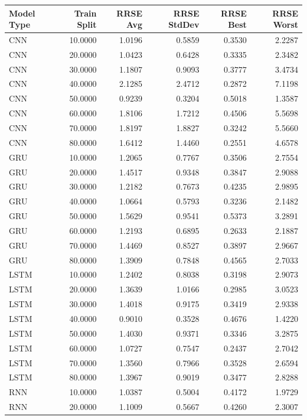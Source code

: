 \begin{tabular}{lrrrrr}
\toprule
Model Type & Train Split & RRSE Avg & RRSE StdDev & RRSE Best & RRSE Worst \\
\midrule
CNN & 10.0000 & 1.0196 & 0.5859 & 0.3530 & 2.2287 \\
CNN & 20.0000 & 1.0423 & 0.6428 & 0.3335 & 2.3482 \\
CNN & 30.0000 & 1.1807 & 0.9093 & 0.3777 & 3.4734 \\
CNN & 40.0000 & 2.1285 & 2.4712 & 0.2872 & 7.1198 \\
CNN & 50.0000 & 0.9239 & 0.3204 & 0.5018 & 1.3587 \\
CNN & 60.0000 & 1.8106 & 1.7212 & 0.4506 & 5.5698 \\
CNN & 70.0000 & 1.8197 & 1.8827 & 0.3242 & 5.5660 \\
CNN & 80.0000 & 1.6412 & 1.4460 & 0.2551 & 4.6578 \\
GRU & 10.0000 & 1.2065 & 0.7767 & 0.3506 & 2.7554 \\
GRU & 20.0000 & 1.4517 & 0.9348 & 0.3847 & 2.9088 \\
GRU & 30.0000 & 1.2182 & 0.7673 & 0.4235 & 2.9895 \\
GRU & 40.0000 & 1.0664 & 0.5793 & 0.3236 & 2.1482 \\
GRU & 50.0000 & 1.5629 & 0.9541 & 0.5373 & 3.2891 \\
GRU & 60.0000 & 1.2193 & 0.6895 & 0.2633 & 2.1887 \\
GRU & 70.0000 & 1.4469 & 0.8527 & 0.3897 & 2.9667 \\
GRU & 80.0000 & 1.3909 & 0.7848 & 0.4565 & 2.7033 \\
LSTM & 10.0000 & 1.2402 & 0.8038 & 0.3198 & 2.9073 \\
LSTM & 20.0000 & 1.3639 & 1.0166 & 0.2985 & 3.0523 \\
LSTM & 30.0000 & 1.4018 & 0.9175 & 0.3419 & 2.9338 \\
LSTM & 40.0000 & 0.9010 & 0.3528 & 0.4676 & 1.4220 \\
LSTM & 50.0000 & 1.4030 & 0.9371 & 0.3346 & 3.2875 \\
LSTM & 60.0000 & 1.0727 & 0.7547 & 0.2437 & 2.7042 \\
LSTM & 70.0000 & 1.3560 & 0.7966 & 0.3528 & 2.6594 \\
LSTM & 80.0000 & 1.3967 & 0.9019 & 0.3477 & 2.8288 \\
RNN & 10.0000 & 1.0387 & 0.5004 & 0.4172 & 1.9729 \\
RNN & 20.0000 & 1.1009 & 0.5667 & 0.4260 & 2.3007 \\

\end{tabular}
